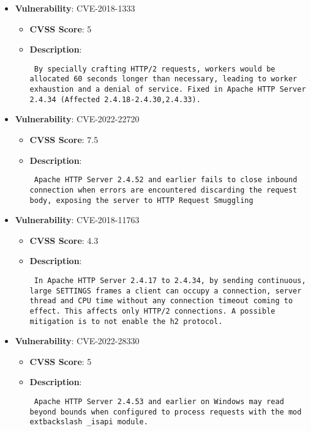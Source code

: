 \documentclass{article}
\begin{document}
\begin{itemize}
        \item \textbf{Vulnerability}: CVE-2018-1333
        \begin{itemize}
            \item \textbf{CVSS Score}:  5 
            \item \textbf{Description}: \parbox{\linewidth}{\texttt{ By specially crafting HTTP/2 requests, workers would be allocated 60 seconds longer than necessary, leading to worker exhaustion and a denial of service. Fixed in Apache HTTP Server 2.4.34 (Affected 2.4.18-2.4.30,2.4.33). }}
        \end{itemize}
    
        \item \textbf{Vulnerability}: CVE-2022-22720
        \begin{itemize}
            \item \textbf{CVSS Score}:  7.5 
            \item \textbf{Description}: \parbox{\linewidth}{\texttt{ Apache HTTP Server 2.4.52 and earlier fails to close inbound connection when errors are encountered discarding the request body, exposing the server to HTTP Request Smuggling }}
        \end{itemize}
    
        \item \textbf{Vulnerability}: CVE-2018-11763
        \begin{itemize}
            \item \textbf{CVSS Score}:  4.3 
            \item \textbf{Description}: \parbox{\linewidth}{\texttt{ In Apache HTTP Server 2.4.17 to 2.4.34, by sending continuous, large SETTINGS frames a client can occupy a connection, server thread and CPU time without any connection timeout coming to effect. This affects only HTTP/2 connections. A possible mitigation is to not enable the h2 protocol. }}
        \end{itemize}
    
        \item \textbf{Vulnerability}: CVE-2022-28330
        \begin{itemize}
            \item \textbf{CVSS Score}:  5 
            \item \textbf{Description}: \parbox{\linewidth}{\texttt{ Apache HTTP Server 2.4.53 and earlier on Windows may read beyond bounds when configured to process requests with the mod	extbackslash _isapi module. }}
        \end{itemize}
    

\end{itemize}
\end{document}
